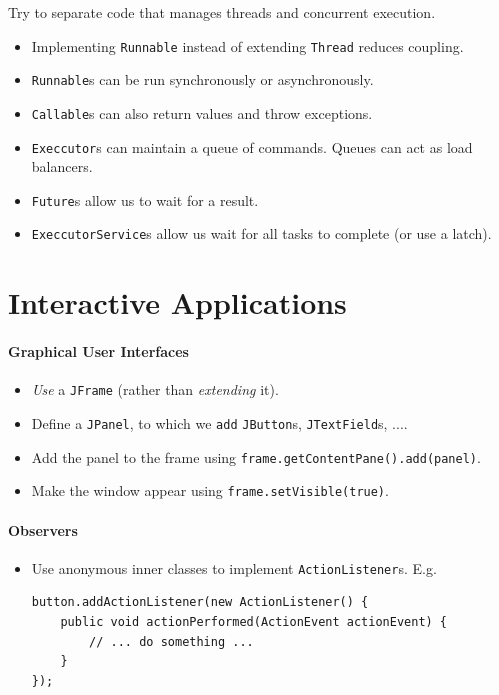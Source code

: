 \documentclass[twocolumn,english]{article}
\begin{document}
Try to separate code that manages threads and concurrent execution.
\begin{itemize}
\item Implementing \texttt{Runnable} instead of extending \texttt{Thread}
reduces coupling.
\item \texttt{Runnable}s can be run synchronously or asynchronously.
\item \texttt{Callable}s can also return values and throw exceptions.
\item \texttt{Execcutor}s can maintain a queue of commands. Queues can act
as load balancers.
\item \texttt{Future}s allow us to wait for a result.
\item \texttt{ExeccutorService}s allow us wait for all tasks to complete
(or use a latch).
\end{itemize}

\section{Interactive Applications}

\paragraph{Graphical User Interfaces}
\begin{itemize}
\item \emph{Use} a \texttt{JFrame} (rather than \emph{extending} it).
\item Define a \texttt{JPanel}, to which we \texttt{add} \texttt{JButton}s,
\texttt{JTextField}s, .... 
\item Add the panel to the frame using \texttt{frame.getContentPane().add(panel)}.
\item Make the window appear using \texttt{frame.setVisible(true)}.
\end{itemize}

\paragraph{Observers}
\begin{itemize}
\item Use anonymous inner classes to implement \texttt{ActionListener}s.
E.g.
\begin{lstlisting}
button.addActionListener(new ActionListener() {
	public void actionPerformed(ActionEvent actionEvent) {
		// ... do something ...
	}
});
\end{lstlisting}
\end{itemize}
\end{document}
